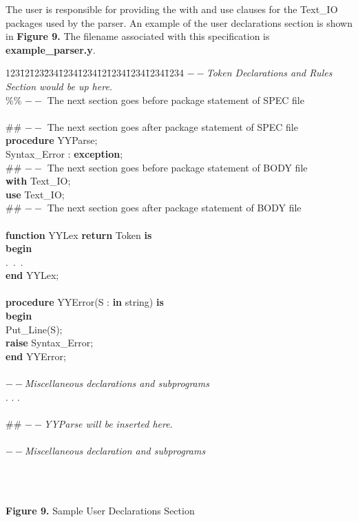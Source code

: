 The user is responsible for providing the with and use clauses for the Text\_IO 
packages used by the parser.  An
example of the user declarations section is shown in {\bf Figure 9.}  The filename
associated with this specification is {\bf example\_parser.y}.
\newpage
\noindent\hspace{-0.05in}\hrulefill\hspace{0.0in}\\
\vspace{-0.2in}
\begin{tabbing}
123\=12\=123\=234\=1234\=1234\=12\=1234\=1234\=1234\=1234 \kill
$--${\it  Token Declarations and Rules Section would be up here.}\\
\%\% $--$ The next section goes before package statement of SPEC file\\
\\
\#\# $--$ The next section goes after package statement of SPEC file\\
\>  {\bf procedure} YYParse;\\
\>  Syntax\_Error : {\bf exception};\\
\#\# $--$ The next section goes before package statement of BODY file\\
{\bf with} Text\_IO;\\
{\bf use}  Text\_IO;\\
\#\# $--$ The next section goes after package statement of BODY file\\
\\
\>  {\bf function} YYLex {\bf return} Token {\bf is}\\
\>  {\bf begin}\\
\>\>    .\ .\ .\\
\>  {\bf end} YYLex;\\
\\
\>  {\bf procedure} YYError(S : {\bf in} string) {\bf is}\\
\>  {\bf begin}\\
\>\>    Put\_Line(S);\\
\>\>    {\bf raise} Syntax\_Error;\\
\>  {\bf end} YYError;\\
\\
\>  $--${\it  Miscellaneous declarations and subprograms}\\
\>  . . .\\
\\
\#\#  $--${\it  YYParse will be inserted here.}\\
\\
\>  $--${\it  Miscellaneous declaration and subprograms}\\
\\
\end{tabbing}
\hspace{-0.05in}\hrulefill\hspace{0.0in}\\
\centerline{{\bf Figure 9.} Sample User Declarations Section}
